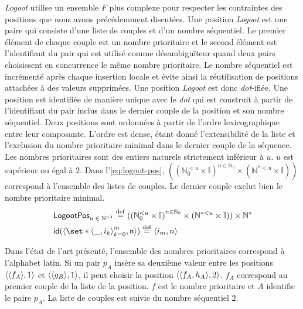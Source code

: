 \emph{Logoot} utilise un ensemble $F$ plus complexe pour respecter les contraintes des positions que nous avons précédemment discutées.
Une position \emph{Logoot} est une paire qui consiste d'une liste de couples et d'un nombre séquentiel.
Le premier élément de chaque couple est un nombre prioritaire et le second élément est l'identifiant du pair qui est utilisé comme désambiguïteur quand deux pairs choisissent en concurrence le même nombre prioritaire.
Le nombre séquentiel est incrémenté après chaque insertion locale et évite ainsi la réutilisation de positions attachées à des valeurs supprimées.
Une position \emph{Logoot} est donc \emph{dot}-ifiée.
Une position est identifiée de manière unique avec le \emph{dot} qui est construit à partir de l'identifiant du pair inclus dans le dernier couple de la position et son nombre séquentiel.
Deux positions sont ordonnées à partir de l'ordre lexicographique entre leur composante.
L'ordre est dense, étant donné l'extensibilité de la liste et l'exclusion du nombre prioritaire minimal dans le dernier couple de la séquence.
Les nombres prioritaires sont des entiers naturels strictement inférieur à $u$.
$u$ est supérieur ou égal à $2$.
Dans l'\autoref{eq:logoot-pos}, $({(\mathbb{N}_0^{< u} \times \mathbb{I})}^{n \in \mathbb{N}_0} \times (\mathbb{N}^{* < u} \times \mathbb{I}))$ correspond à l'ensemble des listes de couples.
Le dernier couple exclut bien le nombre prioritaire minimal.
%
\begin{align}
&\trm{LogootPos}_{u\;\in\;\mathbb{N}^{> 1}} \defeq ({(\mathbb{N}_0^{< u} \times \mathbb{I})}^{n \in \mathbb{N}_0} \times (\mathbb{N}^{* < u} \times \mathbb{I})) \times \mathbb{N}^*\label{eq:logoot-pos}\\
&\trm{id}(\tuple*{\set*{\tuple*{\_, i_k}}_{k=0}^m, \trm{n}}) \defeq \tuple*{i_m, n}
\end{align}

Dans l'état de l'art présenté, l'ensemble des nombres prioritaires correspond à l'alphabet latin.
Si un pair $p_A$ insère sa deuxième valeur entre les positions $\tuple*{\tuple*{f_A}, 1}$ et $\tuple*{\tuple*{g_B}, 1}$, il peut choisir la position $\tuple*{\tuple*{f_A, h_A}, 2}$.
$f_A$ correspond au premier couple de la liste de la position.
$f$ est le nombre prioritaire et $A$ identifie le paire $p_A$.
La liste de couples est suivie du nombre séquentiel $2$.

